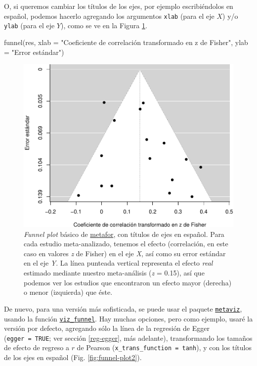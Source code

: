 \documentclass[
  bookmarksnumbered]{article}
\newenvironment{Shaded}{\begin{snugshade}}{\end{snugshade}}
\newcommand{\AttributeTok}[1]{\textcolor[rgb]{0.00,0.34,0.68}{#1}}
\newcommand{\FunctionTok}[1]{\textcolor[rgb]{0.39,0.29,0.61}{#1}}
\newcommand{\NormalTok}[1]{\textcolor[rgb]{0.12,0.11,0.11}{#1}}
\newcommand{\StringTok}[1]{\textcolor[rgb]{0.75,0.01,0.01}{#1}}
\begin{document}
O, si queremos cambiar los títulos de los ejes, por ejemplo escribiéndolos en español, podemos hacerlo agregando los argumentos \texttt{xlab} (para el eje \(X\)) y/o \texttt{ylab} (para el eje \(Y\)), como se ve en la Figura \ref{fig:funnel-plot1a}.

\begin{Shaded}
\begin{Highlighting}[]
\FunctionTok{funnel}\NormalTok{(res, }
       \AttributeTok{xlab =} \StringTok{"Coeficiente de correlación transformado en z de Fisher"}\NormalTok{,}
       \AttributeTok{ylab =} \StringTok{"Error estándar"}\NormalTok{)}
\end{Highlighting}
\end{Shaded}

\begin{figure}
\centering
\includegraphics{Meta-analysis_files/figure-latex/funnel-plot1a-1.pdf}
\caption{\label{fig:funnel-plot1a}\emph{Funnel plot} básico de \href{https://www.metafor-project.org/doku.php}{metafor}, con títulos de ejes en español. Para cada estudio meta-analizado, tenemos el efecto (correlación, en este caso en valores \emph{z} de Fisher) en el eje \emph{X}, así como su error estándar en el eje \emph{Y}. La línea punteada vertical representa el efecto \emph{real} estimado mediante nuestro meta-análisis (\emph{z} = 0.15), así que podemos ver los estudios que encontraron un efecto mayor (derecha) o menor (izquierda) que éste.}
\end{figure}

De nuevo, para una versión más sofisticada, se puede usar el paquete \href{https://cran.r-project.org/web/packages/metaviz/vignettes/metaviz.html}{\texttt{metaviz}}, usando la función \href{https://cran.r-project.org/web/packages/metaviz/vignettes/metaviz.html\#creating-funnel-plots-with-viz_funnel}{\texttt{viz\_funnel}}. Hay muchas opciones, pero como ejemplo, usaré la versión por defecto, agregando sólo la línea de la regresión de Egger (\texttt{egger\ =\ TRUE}; ver sección \ref{reg-egger}, más adelante), transformando los tamaños de efecto de regreso a \(r\) de Pearson (\texttt{x\_trans\_function\ =\ tanh}), y con los títulos de los ejes en español (Fig. \ref{fig:funnel-plot2}).
\end{document}
